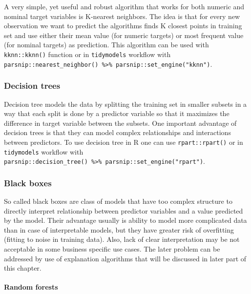 \documentclass[
]{book}
\begin{document}
A very simple, yet useful and robust algorithm that works for both numeric and nominal
target variables is K-nearest neighbors. The idea is that for every new observation
we want to predict the algorithms finds K closest points in training set and use
either their mean value (for numeric targets) or most frequent value (for nominal targets)
as prediction. This algorithm can be used with \texttt{kknn::kknn()} function or in \texttt{tidymodels} workflow
with \texttt{parsnip::nearest\_neighbor()\ \%\textgreater{}\%\ parsnip::set\_engine("kknn")}.

\hypertarget{decision-trees}{%
\subsubsection{Decision trees}\label{decision-trees}}

Decision tree models the data by splitting the training set in smaller subsets
in a way that each split is done by a predictor variable so that it maximizes
the difference in target variable between the subsets. One important advantage
of decision trees is that they can model complex relationships and interactions
between predictors. To use decision tree in R one can use \texttt{rpart::rpart()} or
in \texttt{tidymodels} workflow with \texttt{parsnip::decision\_tree()\ \%\textgreater{}\%\ parsnip::set\_engine("rpart")}.

\hypertarget{black-boxes}{%
\subsubsection{Black boxes}\label{black-boxes}}

So called black boxes are class of models that have too complex structure to directly
interpret relationship between predictor variables and a value predicted by the model.
Their advantage usually is ability to model more complicated data than in case of
interpretable models, but they have greater risk of overfitting (fitting to
noise in training data). Also, lack of clear interpretation may be not acceptable
in some business specific use cases. The later problem can be addressed by use of
explanation algorithms that will be discussed in later part of this chapter.

\hypertarget{random-forests}{%
\paragraph{Random forests}\label{random-forests}}
\end{document}

